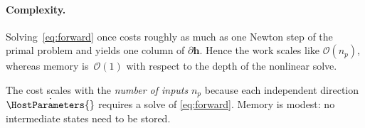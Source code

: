 \paragraph{Complexity.}
Solving~\eqref{eq:forward} once costs roughly as much as one Newton step of the
primal problem and yields one column of $\partial\bm{h}$.  Hence the work scales
like $\mathcal{O}(n_p)$, whereas memory is $\,\mathcal{O}(1)$ with respect to the
depth of the nonlinear solve.

The cost scales with the \emph{number of inputs}
$n_p$ because each independent direction
$\dot{\HostParameters{}}$ requires a solve of \eqref{eq:forward}.
Memory is modest: no intermediate states need to be stored.